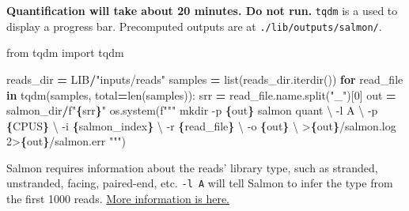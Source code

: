 \documentclass[
]{book}
\newenvironment{Shaded}{\begin{snugshade}}{\end{snugshade}}
\newcommand{\BuiltInTok}[1]{#1}
\newcommand{\CharTok}[1]{\textcolor[rgb]{0.31,0.60,0.02}{#1}}
\newcommand{\ControlFlowTok}[1]{\textcolor[rgb]{0.13,0.29,0.53}{\textbf{#1}}}
\newcommand{\DecValTok}[1]{\textcolor[rgb]{0.00,0.00,0.81}{#1}}
\newcommand{\ImportTok}[1]{#1}
\newcommand{\KeywordTok}[1]{\textcolor[rgb]{0.13,0.29,0.53}{\textbf{#1}}}
\newcommand{\NormalTok}[1]{#1}
\newcommand{\OperatorTok}[1]{\textcolor[rgb]{0.81,0.36,0.00}{\textbf{#1}}}
\newcommand{\SpecialCharTok}[1]{\textcolor[rgb]{0.81,0.36,0.00}{\textbf{#1}}}
\newcommand{\SpecialStringTok}[1]{\textcolor[rgb]{0.31,0.60,0.02}{#1}}
\newcommand{\StringTok}[1]{\textcolor[rgb]{0.31,0.60,0.02}{#1}}
\begin{document}
\textbf{Quantification will take about 20 minutes. Do not run.} \texttt{tqdm} is a used to display a progress bar.
Precomputed outputs are at \texttt{./lib/outputs/salmon/}.

\begin{Shaded}
\begin{Highlighting}[numbers=left,,]
\ImportTok{from}\NormalTok{ tqdm }\ImportTok{import}\NormalTok{ tqdm}

\NormalTok{reads\_dir }\OperatorTok{=}\NormalTok{ LIB}\OperatorTok{/}\StringTok{"inputs/reads"}
\NormalTok{samples }\OperatorTok{=} \BuiltInTok{list}\NormalTok{(reads\_dir.iterdir())}
\ControlFlowTok{for}\NormalTok{ read\_file }\KeywordTok{in}\NormalTok{ tqdm(samples, total}\OperatorTok{=}\BuiltInTok{len}\NormalTok{(samples)):}
\NormalTok{    srr }\OperatorTok{=}\NormalTok{ read\_file.name.split(}\StringTok{"\_"}\NormalTok{)[}\DecValTok{0}\NormalTok{]}
\NormalTok{    out }\OperatorTok{=}\NormalTok{ salmon\_dir}\OperatorTok{/}\SpecialStringTok{f"}\SpecialCharTok{\{}\NormalTok{srr}\SpecialCharTok{\}}\SpecialStringTok{"}
\NormalTok{    os.system(}\SpecialStringTok{f"""}
\SpecialStringTok{        mkdir {-}p }\SpecialCharTok{\{}\NormalTok{out}\SpecialCharTok{\}}
\SpecialStringTok{        salmon quant }\CharTok{\textbackslash{}}
\SpecialStringTok{            {-}l A }\CharTok{\textbackslash{}}
\SpecialStringTok{            {-}p }\SpecialCharTok{\{}\NormalTok{CPUS}\SpecialCharTok{\}}\SpecialStringTok{ }\CharTok{\textbackslash{}}
\SpecialStringTok{            {-}i }\SpecialCharTok{\{}\NormalTok{salmon\_index}\SpecialCharTok{\}}\SpecialStringTok{ }\CharTok{\textbackslash{}}
\SpecialStringTok{            {-}r }\SpecialCharTok{\{}\NormalTok{read\_file}\SpecialCharTok{\}}\SpecialStringTok{ }\CharTok{\textbackslash{}}
\SpecialStringTok{            {-}o }\SpecialCharTok{\{}\NormalTok{out}\SpecialCharTok{\}}\SpecialStringTok{ }\CharTok{\textbackslash{}}
\SpecialStringTok{            \textgreater{}}\SpecialCharTok{\{}\NormalTok{out}\SpecialCharTok{\}}\SpecialStringTok{/salmon.log 2\textgreater{}}\SpecialCharTok{\{}\NormalTok{out}\SpecialCharTok{\}}\SpecialStringTok{/salmon.err}
\SpecialStringTok{    """}\NormalTok{)}
\end{Highlighting}
\end{Shaded}

Salmon requires information about the reads' library type, such as stranded, unstranded, facing, paired-end, etc. \texttt{-l\ A} will tell Salmon to infer the type
from the first 1000 reads. \href{https://salmon.readthedocs.io/en/latest/salmon.html\#what-s-this-libtype}{More information is here.}
\end{document}
